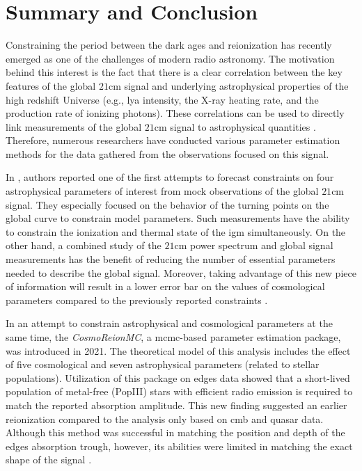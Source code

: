 \documentclass[12pt, TexShade, letterpaper]{report}
\begin{document}
\chapter{Summary and Conclusion}
\label{chap:discussion}
Constraining the period between the dark ages and reionization has recently emerged as one of the challenges of modern radio astronomy. The motivation behind this interest is the fact that there is a clear correlation between the key features of the global $\mathrm{21cm}$ signal and underlying astrophysical properties of the high redshift Universe (e.g., \gls{lya} intensity, the X-ray heating rate, and the production rate of ionizing photons). These correlations can be used to directly link measurements of the global $\mathrm{21cm}$ signal to astrophysical quantities \cite{chart_param_space}.
Therefore, numerous researchers have conducted various parameter estimation methods for the data gathered from the observations focused on this signal.\par

In \cite{pe_galaxy_formation}, authors reported one of the first attempts to forecast constraints on four astrophysical parameters of interest from mock observations of the global $\mathrm{21cm}$ signal. They especially focused on the behavior of the turning points on the global curve to constrain model parameters. Such measurements have the ability to constrain the ionization and thermal state of the \gls{igm} simultaneously. On the other hand, a combined study of the $\mathrm{21cm}$ power spectrum and global signal measurements has the benefit of reducing the number of essential parameters needed to describe the global signal. Moreover, taking advantage of this new piece of information will result in a lower error bar on the values of cosmological parameters compared to the previously reported constraints \cite{21cmpower_global_comnbine}. \par

In an attempt to constrain astrophysical and cosmological parameters at the same time, the \emph{CosmoReionMC}, a \gls{mcmc}-based parameter estimation package, was introduced in 2021. The theoretical model of this analysis includes the effect of five cosmological and seven astrophysical parameters (related to stellar populations). Utilization of this package on \gls{edges} data showed that a short-lived population of metal-free (PopIII) stars with efficient radio emission is required to match the reported absorption amplitude. This new finding suggested an earlier reionization compared to the analysis only based on \gls{cmb} and quasar data. Although this method was successful in matching the position and depth of the \gls{edges} absorption trough, however, its abilities were limited in matching the exact shape of the signal \cite{pe_mcmc_1}.\par
\end{document}
